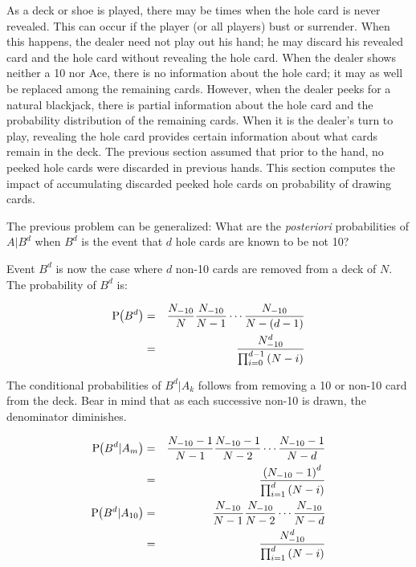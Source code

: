 As a deck or shoe is played, there may be times when the hole card
is never revealed.  This can occur if the player (or all players)
bust or surrender. 
When this happens, the dealer need not play out his hand; 
he may discard his revealed card and the hole card without revealing
the hole card.
When the dealer shows neither a 10 nor Ace, 
there is no information about the hole card;
it may as well be replaced among the remaining cards.  
However, when the dealer peeks for a natural blackjack,
there is partial information about the hole card
and the probability distribution of the remaining cards.  
When it is the dealer's turn to play, 
revealing the hole card provides certain information about 
what cards remain in the deck.  
The previous section assumed that prior to the hand, 
no peeked hole cards were discarded in previous hands.
This section computes the impact of accumulating discarded peeked hole cards
on probability of drawing cards.  

The previous problem can be generalized:
What are the \emph{posteriori} probabilities of $A|B^d$
when $B^d$ is the event that $d$ hole cards are known to be not 10?

Event $B^d$ is now the case where $d$ non-10 cards are
removed from a deck of $N$.
The probability of $B^d$ is:

\begin{eqnarray}
\textrm{P}\hspace{-.5ex}\left(B^d\right) &=& \frac{N_{-10}}{N}\frac{N_{-10}}{N-1}\cdots\frac{N_{-10}}{N-\left(d-1\right)} \nonumber \\
&=& \frac{N_{-10}^d}{\prod_{i=0}^{d-1}{\left(N-i\right)}}
\end{eqnarray}

\noindent
The conditional probabilities of $B^d|A_k$ follows from 
removing a 10 or non-10 card from the deck.
Bear in mind that as each successive non-10 is drawn, 
the denominator diminishes.

\begin{eqnarray}
\textrm{P}\hspace{-.5ex}\left(B^d|A_m\right) &=& \frac{N_{-10}-1}{N-1}\frac{N_{-10}-1}{N-2}\cdots\frac{N_{-10}-1}{N-d} \nonumber \\
&=& \frac{\left(N_{-10}-1\right)^d}{\prod_{i=1}^{d}{\left(N-i\right)}}\\
\textrm{P}\hspace{-.5ex}\left(B^d|A_{10}\right) &=& \frac{N_{-10}}{N-1}\frac{N_{-10}}{N-2}\cdots\frac{N_{-10}}{N-d} \nonumber \\
&=& \frac{N_{-10}^d}{\prod_{i=1}^{d}{\left(N-i\right)}}
\end{eqnarray}

